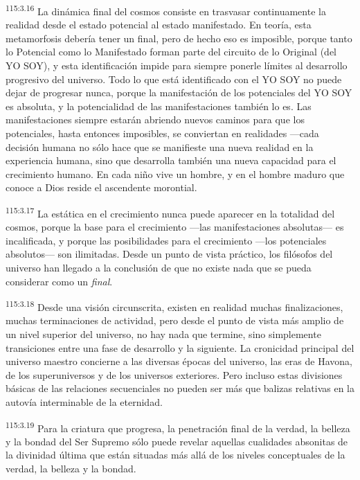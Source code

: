 \par
\textsuperscript{115:3.16} La dinámica final del cosmos consiste en trasvasar continuamente la realidad desde el estado potencial al estado manifestado. En teoría, esta metamorfosis debería tener un final, pero de hecho eso es imposible, porque tanto lo Potencial como lo Manifestado forman parte del circuito de lo Original (del YO SOY), y esta identificación impide para siempre ponerle límites al desarrollo progresivo del universo. Todo lo que está identificado con el YO SOY no puede dejar de progresar nunca, porque la manifestación de los potenciales del YO SOY es absoluta, y la potencialidad de las manifestaciones también lo es. Las manifestaciones siempre estarán abriendo nuevos caminos para que los potenciales, hasta entonces imposibles, se conviertan en realidades ---cada decisión humana no sólo hace que se manifieste una nueva realidad en la experiencia humana, sino que desarrolla también una nueva capacidad para el crecimiento humano. En cada niño vive un hombre, y en el hombre maduro que conoce a Dios reside el ascendente morontial.

\par
\textsuperscript{115:3.17} La estática en el crecimiento nunca puede aparecer en la totalidad del cosmos, porque la base para el crecimiento ---las manifestaciones absolutas--- es incalificada, y porque las posibilidades para el crecimiento ---los potenciales absolutos--- son ilimitadas. Desde un punto de vista práctico, los filósofos del universo han llegado a la conclusión de que no existe nada que se pueda considerar como un \textit{final}.

\par
\textsuperscript{115:3.18} Desde una visión circunscrita, existen en realidad muchas finalizaciones, muchas terminaciones de actividad, pero desde el punto de vista más amplio de un nivel superior del universo, no hay nada que termine, sino simplemente transiciones entre una fase de desarrollo y la siguiente. La cronicidad principal del universo maestro concierne a las diversas épocas del universo, las eras de Havona, de los superuniversos y de los universos exteriores. Pero incluso estas divisiones básicas de las relaciones secuenciales no pueden ser más que balizas relativas en la autovía interminable de la eternidad.

\par
\textsuperscript{115:3.19} Para la criatura que progresa, la penetración final de la verdad, la belleza y la bondad del Ser Supremo sólo puede revelar aquellas cualidades absonitas de la divinidad última que están situadas más allá de los niveles conceptuales de la verdad, la belleza y la bondad.

